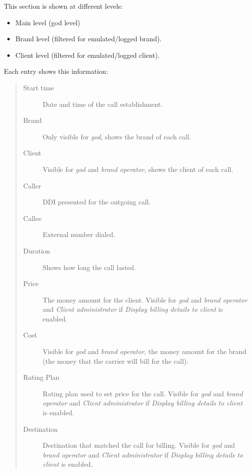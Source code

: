\documentclass[letterpaper,10pt,spanish]{sphinxmanual}
\begin{document}
This section is shown at different levels:
\begin{itemize}
\item {} 
Main level (god level)

\item {} 
Brand level (filtered for emulated/logged brand).

\item {} 
Client level (filtered for emulated/logged client).

\end{itemize}

Each entry shows this information:
\begin{quote}
\begin{description}
\item[{Start time}] \leavevmode
Date and time of the call establishment.

\item[{Brand}] \leavevmode
Only visible for \emph{god}, shows the brand of each call.

\item[{Client}] \leavevmode
Visible for \emph{god} and \emph{brand operator}, shows the client of each call.

\item[{Caller}] \leavevmode
DDI presented for the outgoing call.

\item[{Callee}] \leavevmode
External number dialed.

\item[{Duration}] \leavevmode
Shows how long the call lasted.

\item[{Price}] \leavevmode
The money amount for the client. Visible for \emph{god} and \emph{brand operator} and \emph{Client administrator} if
\emph{Display billing details to client} is enabled.

\item[{Cost}] \leavevmode
Visible for \emph{god} and \emph{brand operator}, the money amount for the brand (the money that the carrier will bill for the call).

\item[{Rating Plan}] \leavevmode
Rating plan used to set price for the call. Visible for \emph{god} and \emph{brand operator} and \emph{Client administrator} if
\emph{Display billing details to client} is enabled.

\item[{Destination}] \leavevmode
Destination that matched the call for billing. Visible for \emph{god} and \emph{brand operator} and \emph{Client administrator} if
\emph{Display billing details to client} is enabled.


\end{description}
\end{quote}
\end{document}
